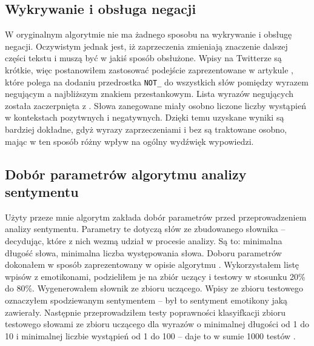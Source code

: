 \subsection{Wykrywanie i obsługa negacji}
\label{subsubsection:wykrywanieiobsluganegacji}
W oryginalnym algorytmie  nie ma żadnego sposobu na
wykrywanie i obsługę negacji. Oczywistym jednak jest, iż zaprzeczenia zmieniają
znaczenie dalszej części tekstu i muszą być w jakiś sposób obsłużone.
Wpisy na Twitterze są krótkie, więc postanowiłem zastosować podejście
zaprezentowane w artykule \cite{thumbsUp2002}, które polega na dodaniu
przedrostka \texttt{NOT\_} do wszystkich słów pomiędzy wyrazem negującym
a najbliższym znakiem przestankowym. Lista wyrazów negujących
została zaczerpnięta z \cite{englishNots1983}. Słowa zanegowane miały osobno
liczone liczby wystąpień w kontekstach pozytwnych i negatywnych.
Dzięki temu uzyskane wyniki są bardziej dokładne, gdyż wyrazy zaprzeczeniami i
bez są traktowane osobno, mając w ten sposób różny wpływ na ogólny wydźwięk
wypowiedzi.







\subsection{Dobór parametrów algorytmu analizy sentymentu}
\label{subsubsection:doborparametrow}
Użyty przeze mnie algorytm zakłada dobór parametrów przed przeprowadzeniem
analizy sentymentu. Parametry te dotyczą słów ze zbudowanego słownika --
decydując, które z nich wezmą udział w procesie analizy. Są to: minimalna
długość słowa, minimalna liczba występowania słowa. Doboru parametrów dokonałem
w sposób zaprezentowany w opisie algorytmu .
Wykorzystałem listę wpisów z emotikonami, podzieliłem je na zbiór uczący i
testowy w stosunku 20\% do 80\%.
Wygenerowałem słownik ze zbioru uczącego. Wpisy ze zbioru testowego oznaczyłem
spodziewanym sentymentem -- był to sentyment emotikony jaką zawierały. Następnie
przeprowadziłem testy poprawności klasyifkacji zbioru testowego słowami ze
zbioru uczącego dla wyrazów o minimalnej długości od 1 do 10 i minimalnej
liczbie wystąpień od 1 do 100 -- daje to w sumie 1000 testów 
.

